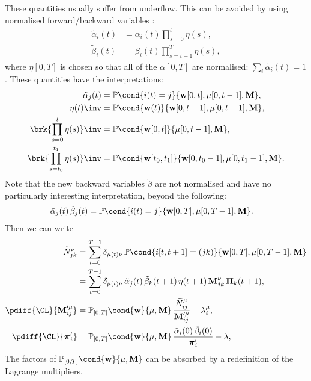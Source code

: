 \documentclass[12pt]{article}
\newcommand{\pib}{\boldsymbol{\pi}}
\newcommand{\Pib}{\boldsymbol{\Pi}}
\newcommand{\w}{\mathbf{w}}
\newcommand{\M}{\mathbf{M}}
\newcommand{\pr}{\mathbb{P}}
\begin{document}
These quantities usually suffer from underflow.
This can be avoided by using normalised forward/backward variables \cite{Zhai2003HMMnorm}:
%
\begin{equation}\label{eq:normalphabeta}
\begin{aligned}
  \tilde{\alpha}_i(t) &= \alpha_i(t) \prod_{s=0}^{t} \eta(s), \\
  \tilde{\beta}_i(t) &= \beta_i(t) \prod_{s=t+1}^{T} \eta(s),
\end{aligned}
\end{equation}
%
where $\eta[0,T]$ is chosen so that all of the $\tilde{\alpha}[0,T]$ are normalised: $\sum_i \tilde{\alpha}_i(t) = 1$.
These quantities have the interpretations:
%
\begin{equation}\label{eq:normintepr}
\begin{aligned}
  \tilde{\alpha}_j(t) &= \pr\cond{i(t)=j}{\w[0,t],\mu[0,t-1],\M}, \\
  \eta(t)\inv &= \pr\cond{\w(t)}{\w[0,t-1],\mu[0,t-1],\M}, \\
  \brk{\prod_{s=0}^t \eta(s)}\inv &= \pr\cond{\w[0,t]}{\mu[0,t-1],\M}, \\
  \brk{\prod_{s=t_0}^{t_1} \eta(s)}\inv &= 
          \pr\cond{\w[t_0,t_1]}{\w[0,t_0-1],\mu[0,t_1-1],\M}.
\end{aligned}
\end{equation}
%
Note that the new backward variables $\tilde{\beta}$ are not normalised and have no particularly interesting interpretation, beyond the following:
%
\begin{equation}\label{eq:normstateprob}
\begin{aligned}
  \tilde{\alpha}_j(t) \, \tilde{\beta}_j(t) &= \pr\cond{i(t)=j}{\w[0,T],\mu[0,T-1],\M}.
\end{aligned}
\end{equation}
%
Then we can write
%
\begin{equation}\label{eq:singlediffsnorm}
\begin{aligned}
  \widetilde{N}^\nu_{jk} &= \sum_{t=0}^{T-1} \delta_{\mu(t)\nu} \, 
      \pr\cond{i[t,t+1]=(jk)}{\w[0,T],\mu[0,T-1],\M} \\
     &= \sum_{t=0}^{T-1} \delta_{\mu(t)\nu} \, 
      \tilde{\alpha}_j(t) \, \tilde{\beta}_k(t+1) \, \eta(t+1) \, 
      \M^{\nu}_{jk} \, \Pib_k(t+1) ,\\
  \pdiff{\CL}{\M'^\mu_{ij}} &= \pr_{[0,T]}\cond{\w}{\mu,\M} \, 
      \frac{ \widetilde{N}^\mu_{ij} }{ \M'^\mu_{ij} } - \lambda^\mu_{i}, \\
  \pdiff{\CL}{\pib'_{i}} &= \pr_{[0,T]}\cond{\w}{\mu,\M} \, 
      \frac{ \tilde{\alpha}_i(0) \, \tilde{\beta}_i(0) }{ \pib'_{i} } - \lambda,
\end{aligned}
\end{equation}
%
The factors of $\pr_{[0,T]}\cond{\w}{\mu,\M}$ can be absorbed by a redefinition of the Lagrange multipliers.
\end{document}
